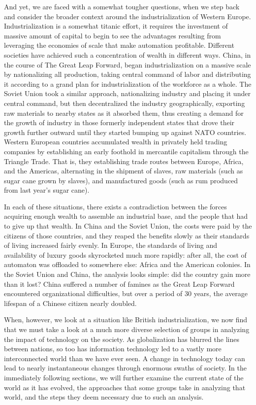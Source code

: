 And yet, we are faced with a somewhat tougher questions, when we step 
back and consider the broader context around the industrialization of 
Western Europe.  Industrialization is a somewhat titanic effort, it 
requires the investment of massive amount of capital to begin to see 
the advantages resulting from leveraging the economies of scale that 
make automation profitable.  Different societies have achieved such 
a concentration of wealth in different ways.  China, in the course of 
The Great Leap Forward, began industrialization on a massive scale by 
nationalizing all production, taking central command of labor and 
distributing it according to a grand plan for industrialization of the 
workforce as a whole.  The Soviet Union took a similar approach, 
nationalizing industry and placing it under central command, but then 
decentralized the industry geographically, exporting raw materials to 
nearby states as it absorbed them, thus creating a demand for the 
growth of industry in those formerly independent states that drove 
their growth further outward until they started bumping up against 
NATO countries.  Western European countries accumulated wealth in 
privately held trading companies by establishing an early foothold 
in mercantile capitalism through the Triangle Trade. That is, they 
establishing trade routes between Europe, Africa, and the Americas, 
alternating in the shipment of slaves, raw materials (such as sugar 
cane grown by slaves), and manufactured goods (such as rum produced 
from last year's sugar cane).  

In each of these situations, there exists a contradiction 
between the forces acquiring enough wealth to assemble an industrial 
base, and the people that had to give up that wealth.  In China and 
the Soviet Union, the costs were paid by the citizens of those 
countries, and they reaped the benefits slowly as their standards of 
living increased fairly evenly.  In Europe, the standards of living 
and availability of luxury goods skyrocketed much more rapidly: after 
all, the cost of automaton was offloaded to somewhere else: Africa and 
the American colonies.  In the Soviet Union and China, the analysis looks 
simple: did the country gain more than it lost?  China suffered a number 
of famines as the Great Leap Forward encountered organizational 
difficulties, but over a period of 30 years, the average lifespan of a 
Chinese citizen nearly doubled.  

When, however, we look at a situation like British industrialization, 
we now find that we must take a look at a much more diverse selection 
of groups in analyzing the impact of technology on the society.  As 
globalization has blurred the lines between nations, so too has 
information technology led to a vastly more interconnected world than 
we have ever seen.  A change in technology today can lead to nearly 
instantaneous changes through enormous swaths of society.  In the 
immediately following sections, we will further examine the current 
state of the world as it has evolved, the approaches that some 
groups take in analyzing that world, and the steps they deem necessary 
due to such an analysis.

